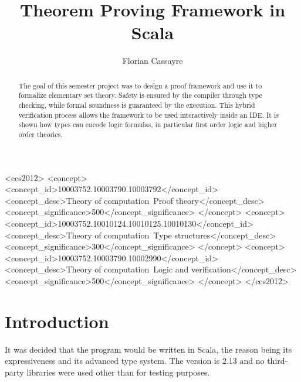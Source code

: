 \documentclass[acmlarge]{acmart}
\begin{document}
\title{Theorem Proving Framework in Scala}

\author{Florian Cassayre}

\renewcommand{\shortauthors}{Florian Cassayre}

\begin{abstract}
  The goal of this semester project was to design a proof framework
  and use it to formalize elementary set theory.
  Safety is ensured by the compiler through type checking,
  while formal soundness is guaranteed by the execution.
  This hybrid verification process allows the framework to be used interactively
  inside an IDE. It is shown how types can encode logic formulas,
  in particular first order logic and higher order theories.
\end{abstract}

\begin{CCSXML}
<ccs2012>
<concept>
<concept_id>10003752.10003790.10003792</concept_id>
<concept_desc>Theory of computation~Proof theory</concept_desc>
<concept_significance>500</concept_significance>
</concept>
<concept>
<concept_id>10003752.10010124.10010125.10010130</concept_id>
<concept_desc>Theory of computation~Type structures</concept_desc>
<concept_significance>300</concept_significance>
</concept>
<concept>
<concept_id>10003752.10003790.10002990</concept_id>
<concept_desc>Theory of computation~Logic and verification</concept_desc>
<concept_significance>500</concept_significance>
</concept>
</ccs2012>
\end{CCSXML}



\maketitle

\section{Introduction}

It was decided that the program would be written in Scala, the reason being its expressiveness and its advanced type system. The version is 2.13 and no third-party libraries were used other than for testing purposes.
\end{document}
